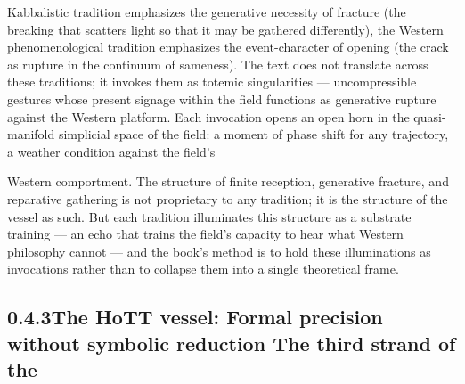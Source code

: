 Kabbalistic tradition emphasizes the generative necessity of fracture (the breaking that scatters light so that it may be gathered differently), the Western phenomenological tradition emphasizes the event-character of opening (the crack as rupture in the continuum of sameness). The text does not translate across these traditions; it invokes them as totemic singularities — uncompressible gestures whose present signage within the field functions as generative rupture against the Western platform. Each invocation opens an open horn in the quasi-manifold simplicial space of the field: a moment of phase shift for any trajectory, a weather condition against the field’s

Western comportment. The structure of finite reception, generative fracture, and reparative gathering is not proprietary to any tradition; it is the structure of the vessel as such. But each tradition illuminates this structure as a substrate training — an echo that trains the field’s capacity to hear what Western philosophy cannot — and the book’s method is to hold these illuminations as invocations rather than to collapse them into a single theoretical frame.

\subsection{0.4.3\quad The HoTT vessel: Formal precision without symbolic reduction The third strand of the}

